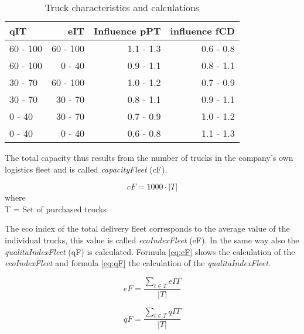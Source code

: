 \begin{table}[ht]
    \centering
    \begin{tabular}{|l|r|r|r|}
    \hline
    \textbf{qIT} & \textbf{eIT} & \textbf{Influence pPT} & \textbf{influence fCD} \\ \hline
    60 - 100      & 60 - 100   & 1.1 - 1.3   & 0.6 - 0.8       \\
    60 - 100      & 0 - 40     & 0.9 - 1.1   & 0.8 - 1.1       \\
    30 - 70       & 60 - 100   & 1.0 - 1.2   & 0.7 - 0.9       \\
    30 - 70       & 30 - 70    & 0.8 - 1.1   & 0.9 - 1.1       \\
    0 - 40        & 30 - 70    & 0.7 - 0.9   & 1.0 - 1.2       \\
    0 - 40        & 0 - 40     & 0.6 - 0.8   & 1.1 - 1.3       \\
    \hline
    \end{tabular}
    \caption{Truck characteristics and calculations}
    \label{Truck_characteristics}
\end{table}

The total capacity thus results from the %
number of trucks in the company's own logistics fleet and is called \textit{capacityFleet} (\gls{cF}). 
\begin{center}
\begin{equation}
\label{func:capacityFleet}
    cF = 1000 \cdot |T|
\end{equation}
where \\
\gls{T} = Set of purchased trucks
\end{center}

The eco index of the total delivery fleet corresponds to the average value of the individual trucks, this value is called \textit{ecoIndexFleet} (\gls{eF}). In the same way also the \textit{qualitaIndexFleet} (\gls{qF}) is calculated. Formula \ref{eq:eF} shows the calculation of the \textit{ecoIndexFleet} and formula \ref{eq:qF} the calculation of the \textit{qualitaIndexFleet}. 
\begin{center}
\begin{equation}
    eF= \frac{\sum_{t \in T} eIT }{|T|}  
\label{eq:eF}
\end{equation}

\begin{equation}
    qF= \frac{\sum_{t \in T} qIT }{|T|}  
\label{eq:qF}
\end{equation}
\end{center}

